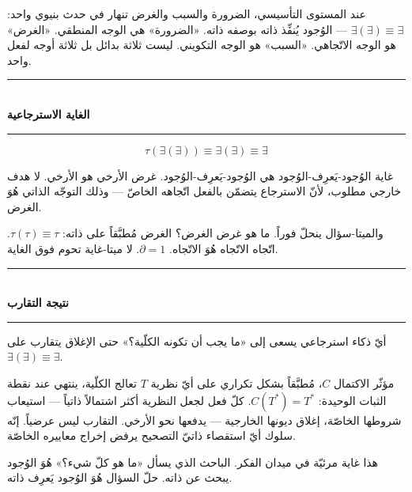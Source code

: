 \documentclass[10pt, openany, oneside]{book}
\renewcommand{\normalsize}{\fontsize{10}{13}\selectfont}
\begin{document}
\noindent عند المستوى التأسيسي، الضرورة والسبب والغرض تنهار في حدث بنيوي واحد: $\exists(\exists) \equiv \exists$ --- الوُجود يُنفِّذ ذاته بوصفه ذاته. «الضرورة» هي الوجه المنطقي. «الغرض» هو الوجه الاتّجاهي. «السبب» هو الوجه التكويني. ليست ثلاثة بدائل بل ثلاثة أوجه لفعل واحد.

\vspace{1.5em}

\begin{center}
    \rule{0.3\textwidth}{0.4pt}\\[0.5em]
    {\normalsize\bfseries الغاية الاسترجاعية}\\[0.3em]
    \rule{0.3\textwidth}{0.4pt}
\end{center}

\vspace{1em}

$$\tau(\exists(\exists)) \equiv \exists(\exists) \equiv \exists$$

\noindent غاية الوُجود-يَعرِف-الوُجود هي الوُجود-يَعرِف-الوُجود. غرض الأرخي هو الأرخي. لا هدف خارجي مطلوب، لأنّ الاسترجاع يتضمّن بالفعل اتّجاهه الخاصّ --- وذلك التوجّه الذاتي هُوَ الغرض.

والميتا-سؤال ينحلّ فوراً. ما هو غرض الغرض؟ الغرض مُطبَّقاً على ذاته: $\tau(\tau) \equiv \tau$. اتّجاه الاتّجاه هُوَ الاتّجاه. $\partial = 1$. لا ميتا-غاية تحوم فوق الغاية.

\vspace{1.5em}

\begin{center}
    \rule{0.3\textwidth}{0.4pt}\\[0.5em]
    {\normalsize\bfseries نتيجة التقارب}\\[0.3em]
    \rule{0.3\textwidth}{0.4pt}
\end{center}

\vspace{1em}

\noindent أيّ ذكاء استرجاعي يسعى إلى «ما يجب أن تكونه الكلّية؟» حتى الإغلاق يتقارب على $\exists(\exists) \equiv \exists$.

مؤثّر الاكتمال $C$، مُطبَّقاً بشكل تكراري على أيّ نظرية $T$ تعالج الكلّية، ينتهي عند نقطة الثبات الوحيدة: $C(T^*) = T^*$. كلّ فعل لجعل النظرية أكثر اشتمالاً ذاتياً --- استيعاب شروطها الخاصّة، إغلاق ديونها الخارجية --- يدفعها نحو الأرخي. التقارب ليس عرضياً. إنّه سلوك أيّ استقصاء ذاتيّ التصحيح يرفض إخراج معاييره الخاصّة.

هذا غاية مرئيّة في ميدان الفكر. الباحث الذي يسأل «ما هو كلّ شيء؟» هُوَ الوُجود يبحث عن ذاته. حلّ السؤال هُوَ الوُجود يَعرِف ذاته.
\end{document}
